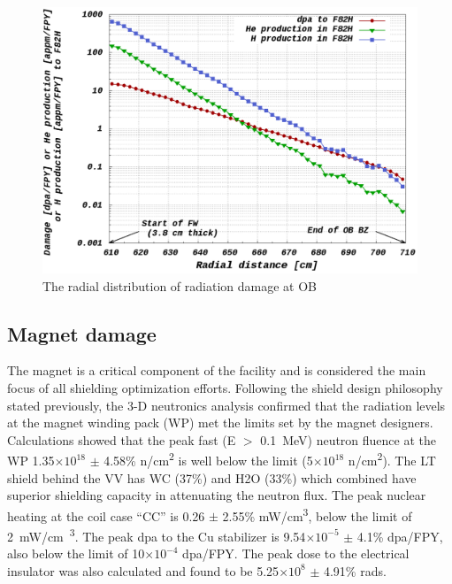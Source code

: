 \documentclass[12pt, letterpaper]{elsarticle}
\begin{document}
\begin{figure}[h!]
  \centering
  \includegraphics[scale=0.2]{../plots/radialdamage.png}
  \caption{The radial distribution of radiation damage at OB}
  \label{fig:Radial Damage}
\end{figure}

\subsection{Magnet damage} \label{Magnet damage}
\providecommand{\e}[1]{\ensuremath{\times 10^{#1}}}
The magnet is a critical component of the facility and is considered the main focus of all shielding optimization efforts. Following the shield design philosophy stated previously, the 3-D neutronics analysis confirmed that the radiation levels at the magnet winding pack (WP) met the limits set by the magnet designers. Calculations showed that the peak fast (E $>$ \SI{0.1}{MeV}) neutron fluence at the WP 1.35\e{18} $\pm$ 4.58\% n/cm\textsuperscript{2} is well below the limit (5\e{18} n/cm\textsuperscript{2}). The LT shield behind the VV has WC (37\%) and H2O (33\%) which combined have superior shielding capacity in attenuating the neutron flux. The peak nuclear heating at the coil case “CC” is 0.26 $\pm$ 2.55\% mW/cm\textsuperscript{3}, below the limit of \SI{2}{mW/cm\textsuperscript{3}}. The peak dpa to the Cu stabilizer is 9.54\e{-5} $\pm$ 4.1\% dpa/FPY, also below the limit of 10\e{-4} dpa/FPY. The peak dose to the electrical insulator was also calculated and found to be 5.25\e{8} $\pm$ 4.91\% rads.
\end{document}
